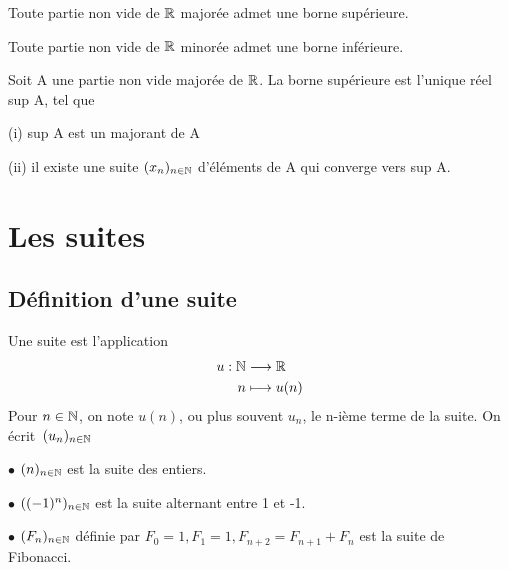 \documentclass[a4paper, 12pt]{article}
\begin{document}
\begin{theorem}
    Toute partie non vide de $\mathbb{R}$ majorée admet une borne supérieure.
\end{theorem}

\begin{theorem}
    Toute partie non vide de $\mathbb{R}$ minorée admet une borne inférieure.
\end{theorem}

\begin{proposition}
    Soit A une partie non vide majorée de $\mathbb{R}$. La borne supérieure est l'unique réel sup A, tel que

    \item (i) sup A est un majorant de A
    \item (ii) il existe une suite $(x_n)_{n \in \mathbb{N}}$ d'éléments de A qui converge vers sup A.
\end{proposition}

\section{Les suites}

\subsection{Définition d'une suite}

\begin{definition}
    Une suite est l'application
    \begin{align*}
        u: \mathbb{N} &\longrightarrow \mathbb{R}\\
        n &\longmapsto u(n)
    \end{align*}
    Pour $n \in \mathbb{N}$, on note $u(n)$, ou plus souvent $u_n$, le n-ième terme de la suite.
    On écrit~$(u_n)_{n \in \mathbb{N}}$
\end{definition}




\begin{example}
    \item $\bullet$ $(n)_{n \in \mathbb{N}}$ est la suite des entiers.
    \item $\bullet$ $((-1)^n)_{n \in \mathbb{N}}$ est la suite alternant entre 1 et -1.
    \item $\bullet$ $(F_n)_{n \in \mathbb{N}}$ définie par $F_0=1, F_1=1, F_{n+2}=F_{n+1}+F_n$
    est la suite de Fibonacci.
\end{example}
\end{document}
